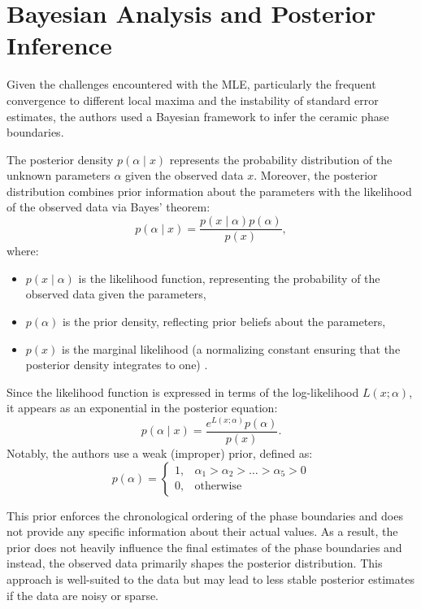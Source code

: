 \documentclass{article}
\begin{document}
\section{Bayesian Analysis and Posterior Inference}

Given the challenges encountered with the MLE, particularly the frequent convergence to different local maxima and the instability of standard error estimates, the authors used a Bayesian framework to infer the ceramic phase boundaries.

The posterior density $p(\alpha \mid x)$ represents the probability distribution of the unknown parameters $\alpha$ given the observed data $x$. Moreover, the posterior distribution combines prior information about the parameters with the likelihood of the observed data via Bayes' theorem:
\[
p(\alpha \mid x) = \frac{p(x \mid \alpha) p(\alpha)}{p(x)},
\]
where:
\begin{itemize}
    \item $p(x \mid \alpha)$ is the likelihood function, representing the probability of the observed data given the parameters,
    \item $p(\alpha)$ is the prior density, reflecting prior beliefs about the parameters,
    \item $p(x)$ is the marginal likelihood (a normalizing constant ensuring that the posterior density integrates to one) \cite{bayes}.
\end{itemize}

Since the likelihood function is expressed in terms of the log-likelihood $L(x;\alpha)$, it appears as an exponential in the posterior equation:
\[
p({\alpha} \mid x) = \frac{e^{L(x;\alpha)} p(\alpha)}{p(x)}.
\]
Notably, the authors use a weak (improper) prior, defined as: 
\[
p(\alpha) = 
\begin{cases}
1, & \alpha_1 > \alpha_2 > \dots > \alpha_5 > 0 \\
0, & \text{otherwise}
\end{cases}
\]

This prior enforces the chronological ordering of the phase boundaries and does not provide any specific information about their actual values. As a result, the prior does not heavily influence the final estimates of the phase boundaries and instead, the observed data primarily shapes the posterior distribution. This approach is well-suited to the data but may lead to less stable posterior estimates if the data are noisy or sparse.
\end{document}
